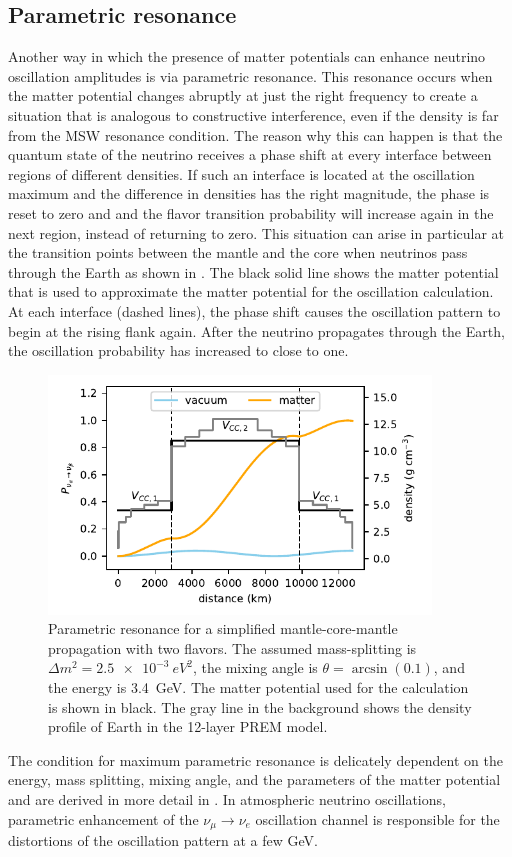 \subsection{Parametric resonance}
Another way in which the presence of matter potentials can enhance neutrino oscillation amplitudes is via parametric resonance. This resonance occurs when the matter potential changes abruptly at just the right frequency to create a situation that is analogous to constructive interference, even if the density is far from the MSW resonance condition. The reason why this can happen is that the quantum state of the neutrino receives a phase shift at every interface between regions of different densities. If such an interface is located at the oscillation maximum and the difference in densities has the right magnitude, the phase is reset to zero and and the flavor transition probability will increase again in the next region, instead of returning to zero. This situation can arise in particular at the transition points between the mantle and the core when neutrinos pass through the Earth as shown in . The black solid line shows the matter potential that is used to approximate the matter potential for the oscillation calculation. At each interface (dashed lines), the phase shift causes the oscillation pattern to begin at the rising flank again. After the neutrino propagates through the Earth, the oscillation probability has increased to close to one.
\begin{figure}
    \includegraphics[width=4in]{figures/theory/parametric_resonance.pdf}
    \caption{Parametric resonance for a simplified mantle-core-mantle propagation with two flavors. The assumed mass-splitting is $\Delta m^2=\SI{2.5e-3}{eV^2}$, the mixing angle is $\theta=\arcsin(0.1)$, and the energy is \SI{3.4}{GeV}. The matter potential used for the calculation is shown in black. The gray line in the background shows the density profile of Earth in the 12-layer PREM model.\label{fig:parametric-resonance}}
\end{figure}
The condition for maximum parametric resonance is delicately dependent on the energy, mass splitting, mixing angle, and the parameters of the matter potential and are derived in more detail in \cite{Akhmedov:1999ty}. In atmospheric neutrino oscillations, parametric enhancement of the $\nu_\mu\rightarrow\nu_e$ oscillation channel is responsible for the distortions of the oscillation pattern at a few GeV.


